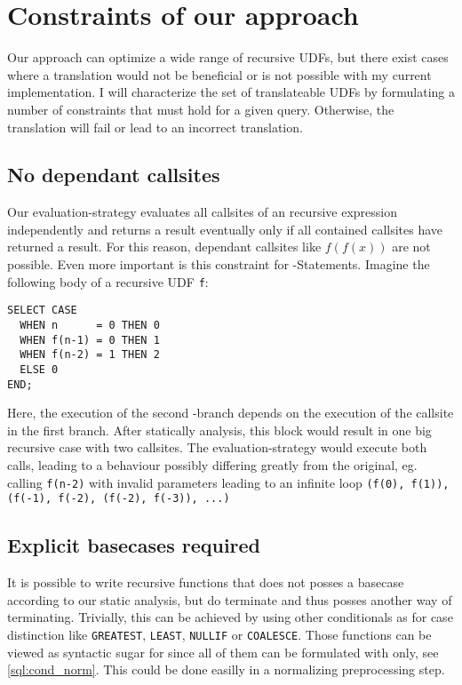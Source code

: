 \section{Constraints of our approach}
Our approach can optimize a wide range of recursive UDFs, but there exist cases where a translation would not be beneficial or is not possible with my current implementation. I will characterize the set of translateable UDFs by formulating a number of constraints that must hold for a given query. Otherwise, the translation will fail or lead to an incorrect translation.
 
\subsection{No dependant callsites}
Our evaluation-strategy evaluates all callsites of an recursive expression independently and returns a result eventually only if all contained callsites have returned a result. For this reason, dependant callsites like $f(f(x))$ are not possible. Even more important is this constraint for \CASE-Statements. Imagine the following body of a recursive UDF \texttt{f}:
\begin{verbatim} 
SELECT CASE
  WHEN n      = 0 THEN 0
  WHEN f(n-1) = 0 THEN 1
  WHEN f(n-2) = 1 THEN 2
  ELSE 0
END;
\end{verbatim}
Here, the execution of the second \CASE-branch depends on the execution of the callsite in the first branch. After statically analysis, this block would result in one big recursive case with two callsites. The evaluation-strategy would execute both calls, leading to a behaviour possibly differing greatly from the original, eg. calling \texttt{f(n-2)} with invalid parameters leading to an infinite loop \texttt{(f(0), f(1)), (f(-1), f(-2), (f(-2), f(-3)), ...)}

\subsection{Explicit basecases required}
It is possible to write recursive functions that does not posses a basecase according to our static analysis, but do terminate and thus posses another way of terminating. Trivially, this can be achieved by using other conditionals as \CASE for case distinction like \texttt{GREATEST}, \texttt{LEAST}, \texttt{NULLIF} or \texttt{COALESCE}. Those functions can be viewed as syntactic sugar for \CASE since all of them can be formulated with \CASE only, see \ref{sql:cond_norm}. This could be done easilly in a normalizing preprocessing step.


